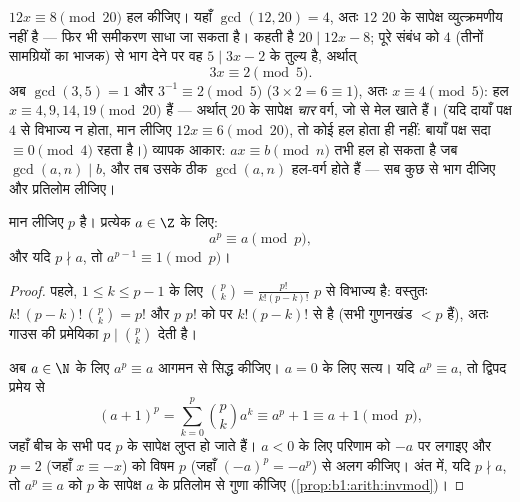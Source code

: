 \begin{example}[जब गुणांक व्युत्क्रमणीय न हो]\label{ex:b1:arith:noninvertible}
$12x \equiv 8 \pmod{20}$ हल कीजिए। यहाँ $\gcd(12, 20) = 4$, अतः $12$ $20$ के
सापेक्ष व्युत्क्रमणीय नहीं है --- फिर भी समीकरण साधा जा सकता है। 
कहती है $20 \mid 12x - 8$; पूरे संबंध को $4$ (तीनों सामग्रियों का भाजक) से
भाग देने पर वह $5 \mid 3x - 2$ के तुल्य है, अर्थात्
\[
3x \equiv 2 \pmod 5 .
\]
अब $\gcd(3, 5) = 1$ और $3^{-1} \equiv 2 \pmod 5$ ($3 \times 2 = 6 \equiv
1$), अतः $x \equiv 4 \pmod 5$: हल $x \equiv 4, 9, 14, 19 \pmod{20}$ हैं ---
अर्थात् $20$ के सापेक्ष \emph{चार} वर्ग, जो  से मेल खाते
हैं। (यदि दायाँ पक्ष $4$ से विभाज्य न होता, मान लीजिए $12x \equiv 6
\pmod{20}$, तो कोई हल होता ही नहीं: बायाँ पक्ष सदा $\equiv 0 \pmod 4$ रहता
है।) व्यापक आकार: $ax \equiv b \pmod n$ तभी हल हो सकता है जब $\gcd(a, n)
\mid b$, और तब उसके ठीक $\gcd(a, n)$ हल-वर्ग होते हैं --- सब कुछ  से भाग दीजिए और प्रतिलोम लीजिए।
\end{example}

\begin{theorem}[फर्मा की लघु प्रमेय]\label{thm:b1:arith:fermat}
मान लीजिए $p$  है। प्रत्येक $a \in \Z$ के लिए:
\[
a^p \equiv a \pmod p,
\]
और यदि $p \nmid a$, तो $a^{p-1} \equiv 1 \pmod p$।
\end{theorem}

\begin{proof}
पहले, $1 \leq k \leq p - 1$ के लिए  $\binom pk =
\frac{p!}{k!(p-k)!}$ $p$ से विभाज्य है: वस्तुतः $k!\,(p-k)!\, \binom pk =
p!$ और $p$ $p!$ को  पर $k!(p-k)!$ से  है (सभी गुणनखंड
$< p$ हैं), अतः गाउस की प्रमेयिका $p \mid \binom pk$ देती है।

अब $a \in \N$ के लिए $a^p \equiv a$ आगमन से सिद्ध कीजिए। $a = 0$ के लिए
सत्य। यदि $a^p \equiv a$, तो द्विपद प्रमेय से
\[
(a+1)^p = \sum_{k=0}^{p} \binom pk a^k
\equiv a^p + 1 \equiv a + 1 \pmod p,
\]
जहाँ बीच के सभी पद $p$ के सापेक्ष लुप्त हो जाते हैं। $a < 0$ के लिए परिणाम
को $-a$ पर लगाइए और $p = 2$ (जहाँ $x \equiv -x$) को विषम $p$ (जहाँ $(-a)^p =
-a^p$) से अलग कीजिए। अंत में, यदि $p \nmid a$, तो $a^p \equiv a$ को $p$ के
सापेक्ष $a$ के प्रतिलोम से गुणा कीजिए (\cref{prop:b1:arith:invmod})।
\end{proof}

